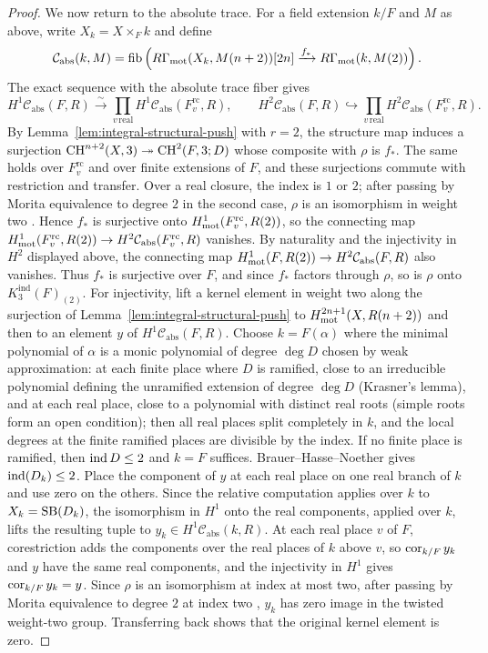 \begin{proof}
We now return to the absolute trace.
For a field extension $k/F$ and $M$ as above, write $X_k=X\times_Fk$ and define
\[
 \mathcal C_{\mathrm{abs}}(k,M)=\operatorname{fib}\left(
 R\Gamma_{\mathrm{mot}}(X_k,M(n+2))[2n]
 \xrightarrow{f_*} R\Gamma_{\mathrm{mot}}(k,M(2))
 \right).
\]
The exact sequence with the absolute trace fiber gives
\[
 H^1\mathcal C_{\mathrm{abs}}(F,R)
 \xrightarrow{\sim}\prod_{v\,\mathrm{real}}H^1\mathcal C_{\mathrm{abs}}(F_v^{\mathrm{rc}},R),
 \qquad
 H^2\mathcal C_{\mathrm{abs}}(F,R)
 \hookrightarrow\prod_{v\,\mathrm{real}}H^2\mathcal C_{\mathrm{abs}}(F_v^{\mathrm{rc}},R).
\]
By Lemma~\ref{lem:integral-structural-push} with $r=2$, the structure map induces a surjection $\operatorname{CH}^{n+2}(X,3)\twoheadrightarrow\operatorname{CH}^2(F,3;D)$ whose composite with $\rho$ is $f_*$.
The same holds over $F_v^{\mathrm{rc}}$ and over finite extensions of $F$, and these surjections commute with restriction and transfer.
Over a real closure, the index is $1$ or $2$; after passing by Morita equivalence to degree $2$ in the second case, $\rho$ is an isomorphism in weight two \cite[Theorems 6.5.3 and 8.1.4(1)]{KahnLevine2010}.
Hence $f_*$ is surjective onto $H^1_{\mathrm{mot}}(F_v^{\mathrm{rc}},R(2))$, so the connecting map $H^1_{\mathrm{mot}}(F_v^{\mathrm{rc}},R(2))\to H^2\mathcal C_{\mathrm{abs}}(F_v^{\mathrm{rc}},R)$ vanishes.
By naturality and the injectivity in $H^2$ displayed above, the connecting map $H^1_{\mathrm{mot}}(F,R(2))\to H^2\mathcal C_{\mathrm{abs}}(F,R)$ also vanishes.
Thus $f_*$ is surjective over $F$, and since $f_*$ factors through $\rho$, so is $\rho$ onto $K_3^{\mathrm{ind}}(F)_{(2)}$.
For injectivity, lift a kernel element in weight two along the surjection of Lemma~\ref{lem:integral-structural-push} to $H^{2n+1}_{\mathrm{mot}}(X,R(n+2))$ and then to an element $y$ of $H^1\mathcal C_{\mathrm{abs}}(F,R)$.
Choose $k=F(\alpha)$ where the minimal polynomial of $\alpha$ is a monic polynomial of degree $\deg D$ chosen by weak approximation: at each finite place where $D$ is ramified, close to an irreducible polynomial defining the unramified extension of degree $\deg D$ (Krasner's lemma), and at each real place, close to a polynomial with distinct real roots (simple roots form an open condition); then all real places split completely in $k$, and the local degrees at the finite ramified places are divisible by the index.
If no finite place is ramified, then $\operatorname{ind} D\le2$ and $k=F$ suffices.
Brauer--Hasse--Noether gives $\operatorname{ind}(D_k)\le2$.
Place the component of $y$ at each real place on one real branch of $k$ and use zero on the others.
Since the relative computation applies over $k$ to $X_k=\operatorname{SB}(D_k)$, the isomorphism in $H^1$ onto the real components, applied over $k$, lifts the resulting tuple to $y_k\in H^1\mathcal C_{\mathrm{abs}}(k,R)$.
At each real place $v$ of $F$, corestriction adds the components over the real places of $k$ above $v$, so $\operatorname{cor}_{k/F}y_k$ and $y$ have the same real components, and the injectivity in $H^1$ gives $\operatorname{cor}_{k/F}y_k=y$.
Since $\rho$ is an isomorphism at index at most two, after passing by Morita equivalence to degree $2$ at index two \cite[Theorems 6.5.3 and 8.1.4(1)]{KahnLevine2010}, $y_k$ has zero image in the twisted weight-two group.
Transferring back shows that the original kernel element is zero.
\end{proof}

